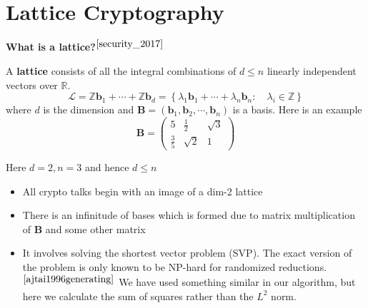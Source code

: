 \documentclass[cryptography,article,submit,moreauthors,pdftex]{Definitions/mdpi}
\begin{document}
\section{Lattice Cryptography}
\textbf{What is a lattice?}$^{\cite{security_2017}}$
\begin{flushleft}
A \textbf{lattice} consists of all the integral combinations of $d\le n$ linearly independent vectors over $\mathbb{R}$. $$\mathcal{L}=\mathbb{Z}\textbf{b}_1+\cdots+\mathbb{Z}\textbf{b}_d=\left\{\lambda_1\textbf{b}_1+\cdots+\lambda_n\textbf{b}_n:\quad \lambda_i\in\mathbb{Z}\right\}$$ where $d$ is the dimension and $\textbf{B}=\left(\textbf{b}_1,\textbf{b}_2,\cdots,\textbf{b}_n\right)$ is a basis. Here is an example $$\textbf{B}=\left(\begin{array}{ccc}5&\frac{1}{2}&\sqrt{3}\\\frac{3}{5}&\sqrt{2}&1
\end{array}\right)$$

Here $d=2,n=3$ and hence $d\le n$
\end{flushleft}

\begin{itemize}
	\item All crypto talks begin with an image of a dim-2 lattice
	\item There is an infinitude of bases which is formed due to matrix multiplication of \textbf{B} and some other matrix
	\item It involves solving the shortest vector problem (SVP). The exact version of the problem is only known to be NP-hard for randomized reductions.$^{\cite{ajtai1996generating}}$ We have used something similar in our algorithm, but here we calculate the sum of squares rather than the $L^2$ norm.
\end{itemize}
\end{document}
